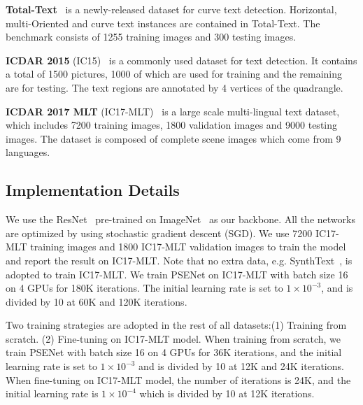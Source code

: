 \documentclass[10pt,twocolumn,letterpaper]{article}
\begin{document}
	\textbf{Total-Text}~\cite{totaltext} is a newly-released dataset for curve text detection. Horizontal, multi-Oriented and curve text instances are contained in Total-Text. The benchmark consists of 1255 training images and 300 testing images.
	
	\textbf{ICDAR 2015} (IC15)~\cite{karatzas2015icdar} is a commonly used dataset for text detection. It contains a total of 1500 pictures, 1000 of which are used for training and the remaining are for testing. The text regions are annotated by 4 vertices of the quadrangle.
	
	\textbf{ICDAR 2017 MLT} (IC17-MLT)~\cite{icdar2017mlt} is a large scale multi-lingual text dataset, which includes 7200 training images, 1800 validation images and 9000 testing images. The dataset is composed of complete scene images which come from 9 languages. 
	
	\subsection{Implementation Details}
	We use the ResNet~\cite{he2016identity} pre-trained on ImageNet~\cite{deng2009imagenet} as our backbone. 
	All the networks are optimized by using stochastic gradient descent (SGD).
	We use 7200 IC17-MLT training images and 1800 IC17-MLT validation images to train the model and report the result on IC17-MLT. Note that no extra data, e.g. SynthText~\cite{synthtext}, is adopted to train IC17-MLT.
	We train PSENet on IC17-MLT with batch size 16 on 4 GPUs for 180K iterations.
	The initial learning rate is set to $1\times10^{-3}$, and is divided by 10 at 60K and 120K iterations.
	 
	Two training strategies are adopted in the rest of all datasets:(1) Training from scratch. (2) Fine-tuning on IC17-MLT model. 
	When training from scratch, we train PSENet with batch size 16 on 4 GPUs for 36K iterations, and the initial learning rate is set to $1\times10^{-3}$ and is divided by 10 at 12K and 24K iterations.
	When fine-tuning on IC17-MLT model, the number of iterations is 24K, and the initial learning rate is $1\times10^{-4}$ which is divided by 10 at 12K iterations.
	
\end{document}
